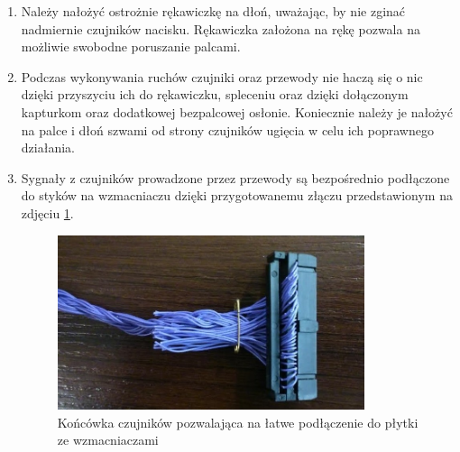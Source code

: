 \documentclass{article}
\begin{document}
\begin{enumerate}
  \item Należy nałożyć ostrożnie rękawiczkę na dłoń, uważając, by nie zginać nadmiernie czujników nacisku. Rękawiczka założona na rękę pozwala na możliwie swobodne poruszanie palcami.
	\item Podczas wykonywania ruchów czujniki oraz przewody nie haczą się o nic dzięki przyszyciu ich do rękawiczku, spleceniu oraz dzięki dołączonym kapturkom oraz dodatkowej bezpalcowej osłonie. Koniecznie należy je nałożyć na palce i dłoń szwami od strony czujników ugięcia w celu ich poprawnego działania.
	\item Sygnały z czujników prowadzone przez przewody są bezpośrednio podłączone do styków na wzmacniaczu dzięki przygotowanemu złączu przedstawionym na zdjęciu \ref{rys:koncowka}.
	\begin{figure}[H]
    \centering
    \includegraphics[width=9cm]{koncowka.jpg}
    \caption{Końcówka czujników pozwalająca na łatwe podłączenie do płytki ze wzmacniaczami}
    \label{rys:koncowka}
  \end{figure}
	

\end{enumerate}
\end{document}
